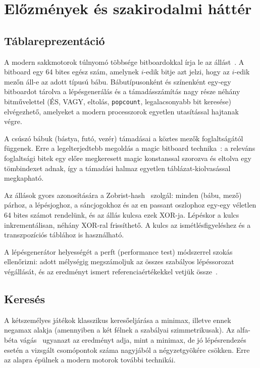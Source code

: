 \chapter{Előzmények és szakirodalmi háttér}\label{chap:background}

\section{Táblareprezentáció}

A modern sakkmotorok túlnyomó többsége bitboardokkal írja le az állást~\cite{CPWBitboards}. A bitboard egy 64 bites egész szám, amelynek $i$-edik bitje azt jelzi, hogy az $i$-edik mezőn áll-e az adott típusú bábu. Bábutípusonként és színenként egy-egy bitboardot tárolva a lépésgenerálás és a támadásszámítás nagy része néhány bitművelettel (ÉS, VAGY, eltolás, \texttt{popcount}, legalacsonyabb bit keresése) elvégezhető, amelyeket a modern processzorok egyetlen utasítással hajtanak végre.

A csúszó bábuk (bástya, futó, vezér) támadásai a köztes mezők foglaltságától függenek. Erre a legelterjedtebb megoldás a magic bitboard technika~\cite{CPWMagic}: a releváns foglaltsági bitek egy előre megkeresett magic konstanssal szorozva és eltolva egy tömbindexet adnak, így a támadási halmaz egyetlen táblázat-kiolvasással megkapható.

Az állások gyors azonosítására a Zobrist-hash~\cite{Zobrist70} szolgál: minden (bábu, mező) párhoz, a lépésjoghoz, a sáncjogokhoz és az en passant oszlophoz egy-egy véletlen 64 bites számot rendelünk, és az állás kulcsa ezek XOR-ja. Lépéskor a kulcs inkrementálisan, néhány XOR-ral frissíthető. A kulcs az ismétlésfigyeléshez és a transzpozíciós táblához is használható.

A lépésgenerátor helyességét a perft (performance test) módszerrel szokás ellenőrizni: adott mélységig megszámoljuk az összes szabályos lépéssorozat végállását, és az eredményt ismert referenciaértékekkel vetjük össze~\cite{CPWPerft}.

\section{Keresés}

A kétszemélyes játékok klasszikus keresőeljárása a minimax, illetve ennek negamax alakja (amennyiben a két félnek a szabályai szimmetrikusak). Az alfa-béta vágás~\cite{Knuth75} ugyanazt az eredményt adja, mint a minimax, de jó lépésrendezés esetén a vizsgált csomópontok száma nagyjából a négyzetgyökére csökken. Erre az alapra épülnek a modern motorok további technikái.

